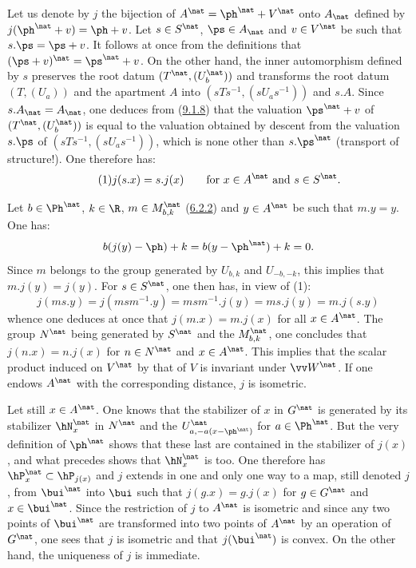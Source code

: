 \documentclass[12pt,a4paper,oneside,english]{smfart}
\makeatletter
\newcommand{\btpageanchor}[1]{\Hy@raisedlink{\hypertarget{p:#1}{}}}
\newcommand{\btref}[1]{\hyperlink{bt:#1}{#1}}
\newcommand{\btpage}[1]{\marginnote{p.~#1}\btpageanchor{#1}}
\newcommand{\pg}[1]{\btpage{#1}}
\theoremstyle{definition}
\theoremstyle{bt}
\makeatother
\begin{document}
Let us denote by $j$ the bijection of $A^\nat=\ph^\nat+V^\nat$ onto $A_\nat$ defined by
$j(\ph^\nat+v)=\ph+v$. Let $s\in S^\nat$, $\ps\in A_\nat$ and $v\in V^\nat$ be such that
$s.\ps=\ps+v$. It follows at once from the definitions that
$(\ps+v)^\nat=\ps^\nat+v$. On the other hand, the inner automorphism defined by $s$
preserves the root datum $(T^\nat,(U^\nat_b))$ and transforms the root datum
$(T,(U_a))$ and the apartment $A$ into $(sTs^{-1},(sU_as^{-1}))$ and $s.A$. Since
$s.A_\nat=A_\nat$, one deduces from (\btref{9.1.8}) that the valuation $\ps^\nat+v$ of
$(T^\nat,(U^\nat_b))$ is equal to the valuation obtained by descent from the valuation
$s.\ps$ of $(sTs^{-1},(sU_as^{-1}))$, which is none other than $s.\ps^\nat$ (transport
of structure!). One therefore has:
\begin{equation}\tag{1}
j(s.x)=s.j(x)\qquad\text{for }x\in A^\nat\text{ and }s\in S^\nat .
\end{equation}

\pg{202}
Let $b\in\Ph^\nat$, $k\in\R$, $m\in M^\nat_{b,k}$ (\btref{6.2.2}) and $y\in A^\nat$ be such that
$m.y=y$. One has:
\[
b(j(y)-\ph)+k=b(y-\ph^\nat)+k=0 .
\]
Since $m$ belongs to the group generated by $U_{b,k}$ and $U_{-b,-k}$, this implies that
$m.j(y)=j(y)$. For $s\in S^\nat$, one then has, in view of (1):
\[
j(ms.y)=j(msm^{-1}.y)=msm^{-1}.j(y)=ms.j(y)=m.j(s.y)
\]
whence one deduces at once that $j(m.x)=m.j(x)$ for all $x\in A^\nat$. The group
$N^\nat$ being generated by $S^\nat$ and the $M^\nat_{b,k}$, one concludes that
$j(n.x)=n.j(x)$ for $n\in N^\nat$ and $x\in A^\nat$. This implies that the scalar
product induced on $V^\nat$ by that of $V$ is invariant under $\vv W^\nat$. If one
endows $A^\nat$ with the corresponding distance, $j$ is isometric.

Let still $x\in A^\nat$. One knows that the stabilizer of $x$ in $G^\nat$ is generated
by its stabilizer $\hN^\nat_x$ in $N^\nat$ and the $U^\nat_{a,-a(x-\ph^\nat)}$ for
$a\in\Ph^\nat$. But the very definition of $\ph^\nat$ shows that these last are contained
in the stabilizer of $j(x)$, and what precedes shows that $\hN^\nat_x$ is too. One
therefore has $\hP^\nat_x\subset\hP_{j(x)}$ and $j$ extends in one and only one way to a
map, still denoted $j$, from $\bui^\nat$ into $\bui$ such that $j(g.x)=g.j(x)$ for
$g\in G^\nat$ and $x\in\bui^\nat$. Since the restriction of $j$ to $A^\nat$ is isometric
and since any two points of $\bui^\nat$ are transformed into two points of $A^\nat$ by
an operation of $G^\nat$, one sees that $j$ is isometric and that $j(\bui^\nat)$ is
convex. On the other hand, the uniqueness of $j$ is immediate.
\end{document}
